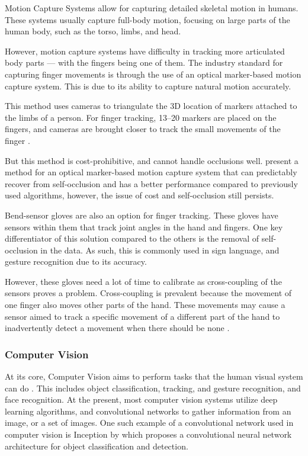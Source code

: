 \documentclass{report}
\begin{document}
Motion Capture Systems allow for capturing detailed skeletal motion in humans.
These systems usually capture full-body motion, focusing on large parts of the
human body, such as the torso, limbs, and head.

However, motion capture systems have difficulty in tracking more articulated
body parts --- with the fingers being one of them. The industry standard for
capturing finger movements is through the use of an optical marker-based motion
capture system. This is due to its ability to capture natural motion accurately.

This method uses cameras to triangulate the 3D location of markers attached to
the limbs of a person. For finger tracking, 13--20 markers are placed on the
fingers, and cameras are brought closer to track the small movements of the
finger \parencite{wheatland2015}.

But this method is cost-prohibitive, and cannot handle occlusions well.
\citeauthor{alexanderson2016} present a method for an optical marker-based
motion capture system that can predictably recover from self-occlusion and has a
better performance compared to previously used algorithms, however, the issue of
cost and self-occlusion still persists.

Bend-sensor gloves are also an option for finger tracking. These gloves have
sensors within them that track joint angles in the hand and fingers. One key
differentiator of this solution compared to the others is the removal of
self-occlusion in the data. As such, this is commonly used in sign language, and
gesture recognition due to its accuracy.

However, these gloves need a lot of time to calibrate as cross-coupling of the
sensors proves a problem. Cross-coupling is prevalent because the movement of
one finger also moves other parts of the hand. These movements may cause a
sensor aimed to track a specific movement of a different part of the hand to
inadvertently detect a movement when there should be none
\parencite{wheatland2015}.

\subsubsection{Computer Vision}

At its core, Computer Vision aims to perform tasks that the human visual system
can do \parencite{cern}. This includes object classification, tracking, and
gesture recognition, and face recognition. At the present, most computer vision
systems utilize deep learning algorithms, and convolutional networks to gather
information from an image, or a set of images. One such example of a
convolutional network used in computer vision is Inception by
\citeauthor{szegedy2015} which proposes a convolutional neural network
architecture for object classification and detection.
\end{document}
